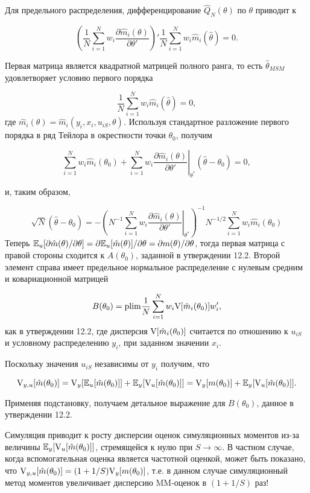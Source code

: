 Для предельного распределения, дифференцирование $\hat{Q}_N(\theta)$ по $\theta$ приводит к

\[
\left(\dfrac{1}{N}\sum^{N}_{i=1}w_{i}\dfrac{\partial\hat{m}_{i}(\theta)}{\partial{\theta}'} \right)'\dfrac{1}{N}\sum^{N}_{i=1}w_{i}\hat{m}_{i}(\hat{\theta})=0.
\]

Первая матрица является квадратной матрицей полного ранга, то есть  $\hat{\theta}_{MSM}$ удовлетворяет условию первого порядка

\[
\dfrac{1}{N}\sum^{N}_{i=1}w_{i}\hat{m}_{i}(\hat{\theta})=0,
\]
где $\hat{m}_{i}(\theta)=\hat{m}_{i}(y_i,x_i,u_{iS},\theta)$. Используя стандартное разложение первого порядка в ряд Тейлора в окрестности точки $\theta_0$, получим

\[
\left. \sum^{N}_{i=1}w_{i}\hat{m}_{i}(\theta_0)+\sum^{N}_{i=1}w_{i}\dfrac{\partial{\hat{m}}_{i}(\theta)}{\partial{\theta}'}\right|_{\theta^{*}}(\hat{\theta}-\theta_0)=0,
\]

и, таким образом,

\[
\left. \sqrt{N}(\hat{\theta}-\theta_0)=-\left(N^{-1}\sum^{N}_{i=1}w_{i}\dfrac{\partial\hat{m}_i(\theta)}{\partial\theta'}\right|_{\theta^{*}}\right)^{-1}N^{-1/2}\sum^{N}_{i=1}w_{i}\hat{m}_i(\theta_0) 
\]
Теперь $\mathbb{E}_{u}[\partial\hat{m}(\theta)/\partial\theta]=\partial{\mathbb{E}_u[\hat{m}(\theta)]}/\partial\theta=\partial{m(\theta)}/\partial\theta$, тогда первая матрица с правой стороны сходится к $A(\theta_0)$, заданной в утверждении 12.2. Второй элемент справа имеет предельное нормальное распределение с нулевым средним и ковариационной матрицей

\[
B(\theta_0)=\mathrm{plim }{\dfrac{1}{N}}\sum^{N}_{i=1}w_{i}\mathrm{V}[\hat{m}_{i}(\theta_0)]w'_{i},
\]
как в утверждении 12.2, где дисперсия $\mathrm{V}[\hat{m}_{i}(\theta_0)]$ считается по отношению к  $u_{iS}$ и условному распределению $y_i$, при заданном значении $x_i$.

Поскольку значения $u_{iS}$ независимы от $y_i$ получим, что

\[
\mathrm{V}_{y,u}[\hat{m}(\theta_0)]=\mathrm{V}_{y}[\mathbb{E}_{u}[\hat{m}(\theta_0)]]+\mathbb{E}_{y}[\mathrm{V}_{u}[\hat{m}(\theta_0)]]=\mathrm{V}_{y}[m(\theta_0)]+\mathbb{E}_{y}[\mathrm{V}_{u}[\hat{m}(\theta_0)]].
\]

Применяя подстановку, получаем детальное выражение для $B(\theta_0)$,  данное в утверждении 12.2.


Симуляция приводит к росту дисперсии оценок симуляционных моментов из-за величины $\mathbb{E}_{y}[\mathrm{V}_{u}[\hat{m}(\theta_0)]]$, стремящейся к нулю при $S \rightarrow \infty$. В частном случае, когда вспомогательная оценка является частотной оценкой, может быть показано, что $\mathrm{V}_{y,u}[\hat{m}(\theta_0)]=(1+1/S)\mathrm{V}_{y}[m(\theta_0)]$, т.е. в данном случае симуляционный метод моментов увеличивает дисперсию MM-оценок в $(1+1/S)$ раз!

